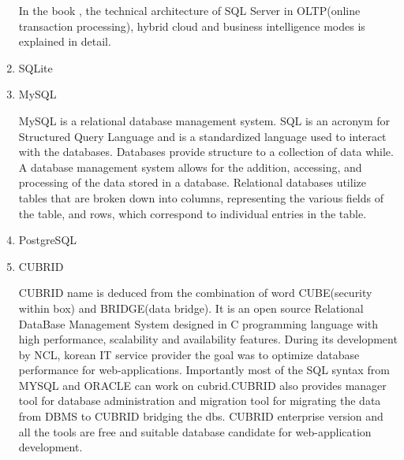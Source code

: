 \begin{enumerate}
\begin{enumerate}
\end{enumerate}

In the book \label{\detokenize{i524/technologies:id369}}{\hyperref[\detokenize{i524/technologies:book-sqlserver}]{\sphinxcrossref{{[}316{]}}}}, the technical architecture of
SQL Server in OLTP(online transaction processing), hybrid cloud
and business intelligence modes is explained in detail.

\item {} 
SQLite

\item {} 
MySQL

MySQL is a relational database management system. \label{\detokenize{i524/technologies:id370}}{\hyperref[\detokenize{i524/technologies:devmysql}]{\sphinxcrossref{{[}317{]}}}} SQL
is an acronym for Structured Query Language and is a standardized
language used to interact with the databases. \label{\detokenize{i524/technologies:id371}}{\hyperref[\detokenize{i524/technologies:devmysql}]{\sphinxcrossref{{[}317{]}}}}
Databases provide structure to a collection of data
while. \label{\detokenize{i524/technologies:id372}}{\hyperref[\detokenize{i524/technologies:devmysql}]{\sphinxcrossref{{[}317{]}}}} A database management system allows for the
addition, accessing, and processing of the data stored in a
database. \label{\detokenize{i524/technologies:id373}}{\hyperref[\detokenize{i524/technologies:devmysql}]{\sphinxcrossref{{[}317{]}}}} Relational databases utilize tables that are
broken down into columns, representing the various fields of the
table, and rows, which correspond to individual entries in the
table. \label{\detokenize{i524/technologies:id374}}{\hyperref[\detokenize{i524/technologies:howmysql}]{\sphinxcrossref{{[}318{]}}}}

\item {} 
PostgreSQL

\item {} 
CUBRID

CUBRID name is deduced from the combination of word CUBE(security
within box) and BRIDGE(data bridge).  It is an open source
Relational DataBase Management System designed in C programming
language with high performance, scalability and availability
features. During its development by NCL, korean IT service
provider the goal was to optimize database performance for
web-applications. \label{\detokenize{i524/technologies:id375}}{\hyperref[\detokenize{i524/technologies:www-cubrid}]{\sphinxcrossref{{[}319{]}}}} Importantly most of the SQL
syntax from MYSQL and ORACLE can work on cubrid.CUBRID also
provides manager tool for database administration and migration
tool for migrating the data from DBMS to CUBRID bridging the dbs.
CUBRID enterprise version and all the tools are free and suitable
database candidate for web-application development.


\end{enumerate}

